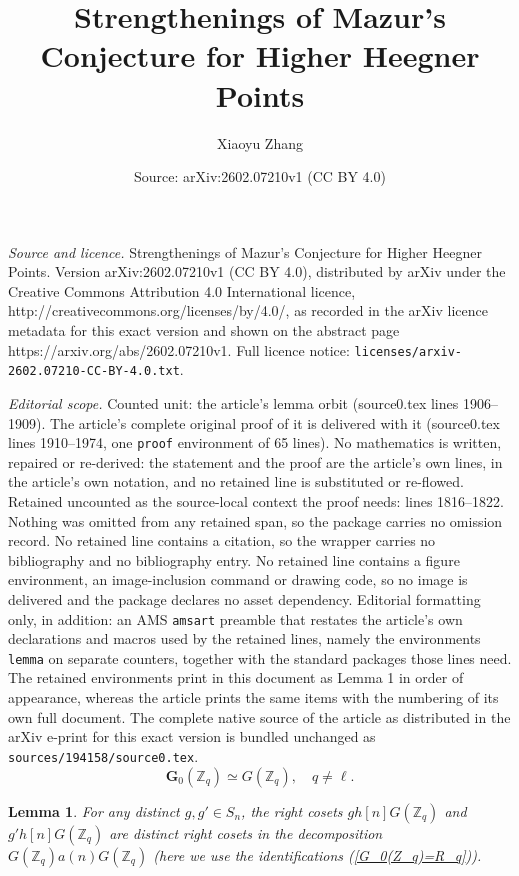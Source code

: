 \documentclass[10pt,a4paper]{amsart}
\title{Strengthenings of Mazur's Conjecture for Higher Heegner Points}
\author{Xiaoyu Zhang}
\date{Source: arXiv:2602.07210v1 (CC BY 4.0)}
\newtheorem{lemma}{Lemma}
\newcommand{\Gbf}{\mathbf{G}}
\newcommand{\Z}{\mathbb{Z}}
\begin{document}
\maketitle

\noindent\emph{Source and licence.} Strengthenings of Mazur's Conjecture for Higher Heegner Points. Version arXiv:2602.07210v1 (CC BY 4.0), distributed by arXiv under the Creative Commons Attribution 4.0 International licence, http://creativecommons.org/licenses/by/4.0/, as recorded in the arXiv licence metadata for this exact version and shown on the abstract page https://arxiv.org/abs/2602.07210v1. Full licence notice: \texttt{licenses/arxiv-2602.07210-CC-BY-4.0.txt}.\par\smallskip

\noindent\textit{Editorial scope.} Counted unit: the article's lemma orbit (source0.tex lines 1906--1909). The article's complete original proof of it is delivered with it (source0.tex lines 1910--1974, one \texttt{proof} environment of 65 lines). No mathematics is written, repaired or re-derived: the statement and the proof are the article's own lines, in the article's own notation, and no retained line is substituted or re-flowed.  Retained uncounted as the source-local context the proof needs: lines 1816--1822.  Nothing was omitted from any retained span, so the package carries no omission record.  No retained line contains a citation, so the wrapper carries no bibliography and no bibliography entry.  No retained line contains a figure environment, an image-inclusion command or drawing code, so no image is delivered and the package declares no asset dependency.  Editorial formatting only, in addition: an AMS \texttt{amsart} preamble that restates the article's own declarations and macros used by the retained lines, namely the environments \texttt{lemma} on separate counters, together with the standard packages those lines need.  The retained environments print in this document as Lemma 1 in order of appearance, whereas the article prints the same items with the numbering of its own full document.  The complete native source of the article as distributed in the arXiv e-print for this exact version is bundled unchanged as \texttt{sources/194158/source0.tex}.
	\begin{equation}\label{G_0(Z_q)=R_q}
		\Gbf_0(\Z_q)
		\simeq
		G(\Z_q),
		\quad
		q\neq\ell.
	\end{equation}

		\begin{lemma}\label{Galois orbit contained in Hecke orbit}
			For any distinct $g,g'\in S_n$, the right cosets
			$gh[n]G(\Z_q)$ and $g'h[n]G(\Z_q)$ are distinct right cosets in the decomposition $G(\Z_q)a(n)G(\Z_q)$ (here we use the identifications (\ref{G_0(Z_q)=R_q})).
		\end{lemma}
\end{document}
